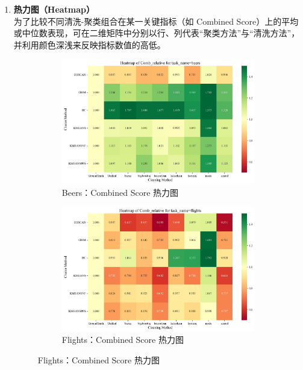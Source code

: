 \documentclass[10pt]{article} %
\numberwithin{equation}{section}
\begin{document}
\begin{enumerate}[label=(\alph*)]
    \item \textbf{热力图（Heatmap）} \\
    为了比较不同清洗-聚类组合在某一关键指标（如 Combined Score）上的平均或中位数表现，可在二维矩阵中分别以行、列代表“聚类方法”与“清洗方法”，并利用颜色深浅来反映指标数值的高低。
\begin{figure}[htbp]
    \centering
    \begin{subfigure}[b]{0.45\linewidth}
        \centering
        \includegraphics[width=\linewidth]{figures/heatmap/heatmap_beers_Comb_relative.pdf}
        \caption{Beers：Combined Score 热力图}
        \label{fig:heatmap_beers}
    \end{subfigure}
    \hfill
    \begin{subfigure}[b]{0.45\linewidth}
        \centering
        \includegraphics[width=\linewidth]{figures/heatmap/heatmap_flights_Comb_relative.pdf}
        \caption{Flights：Combined Score 热力图}
        \label{fig:heatmap_flights}
    \end{subfigure}


\end{figure}
\end{enumerate}
\end{document}
